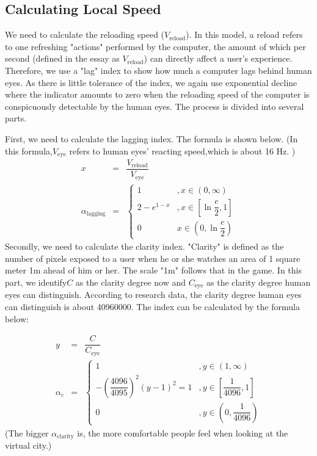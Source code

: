 \documentclass[12pt]{article}
\theoremstyle{definition}
\theoremstyle{remark}
\numberwithin{equation}{section}
\begin{document}
	\subsection{Calculating Local Speed}
		We need to calculate the reloading speed ($V_\mathrm{reload}$). In this model, a reload refers to one refreshing "actions" performed by the computer, the amount of which per second (defined in the essay as $V_\mathrm{reload}$) can directly affect a user's experience. Therefore, we use a "lag" index to show how much a computer lags behind human eyes. As there is little tolerance of the index, we again use exponential decline where the indicator amounts to zero when the reloading speed of the computer is conspicuously detectable by the human eyes. The process is divided into several parts.
		
		First, we need to calculate the lagging index. The formula is shown below. (In this formula,$V_\mathrm{eye}$ refers to human eyes' reacting speed,which is about 16 Hz. )
		\begin{align}
		x&=&\dfrac{V_\mathrm{reload}}{V_\mathrm{eye}}\\
		\alpha_\mathrm{lagging}&=&\left\{\begin{array}{cc}1&,x \in \left(0,\infty\right)\\2-e^{1-x}&,x \in \left[\ln \dfrac{e}{2},1\right]\\0&x \in \left(0,\ln \dfrac{e}{2}\right)\end{array}\right.
		\end{align}
		Secondly, we need to calculate the clarity index. "Clarity" is defined as the number of pixels exposed to a user when he or she watches an area of 1 square meter 1m ahead of him or her. The scale "1m" follows that in the game. In this part, we identify$C$ as the clarity degree now and $C_\mathrm{eye}$ as the clarity degree human eyes can distinguish. According to research data, the clarity degree human eyes can distinguish is about 40960000. The index can be calculated by the formula below:
		
		\begin{align}
			y&=&\dfrac{C}{C_\mathrm{eye}}\\
			\alpha_\mathrm{c}&=&\left\{\begin{array}{cc}1&, y \in \left(1,\infty\right)\\-\left(\dfrac{4096}{4095}\right)^2\left(y-1\right)^2=1&, y \in \left[\dfrac{1}{4096},1\right]\\0&, y \in \left(0,\dfrac{1}{4096}\right)\end{array}\right.
		\end{align}
		(The bigger $\alpha_\mathrm{clarity}$ is, the more comfortable people feel when looking at the virtual city.)
		
\end{document}
